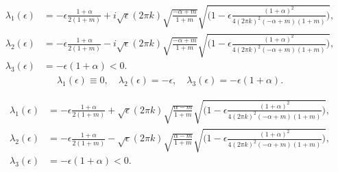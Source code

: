 \documentclass[a4paper,11pt]{article}
\theoremstyle{remark}
\begin{document}
\begin{align*}
 \lambda_1(\epsilon) &= - \epsilon\frac{1+\alpha}{2(1+m)} + i\sqrt{\epsilon}(2\pi k)\sqrt{\frac{-\alpha+m}{1+m}}\sqrt{\Big(1-\epsilon \frac{(1+\alpha)^2}{4(2\pi k)^2(-\alpha+m)(1+m)}\Big)},\\
 \lambda_2(\epsilon) &= - \epsilon\frac{1+\alpha}{2(1+m)} - i\sqrt{\epsilon}(2\pi k)\sqrt{\frac{-\alpha+m}{1+m}}\sqrt{\Big(1-\epsilon \frac{(1+\alpha)^2}{4(2\pi k)^2(-\alpha+m)(1+m)}\Big)},\\
 \lambda_3(\epsilon) &= -\epsilon(1+\alpha)<0.
\end{align*}
\begin{align*}
 \lambda_1(\epsilon)\equiv 0, \quad \lambda_2(\epsilon)= -\epsilon, \quad \lambda_3(\epsilon) = -\epsilon(1+\alpha).
\end{align*}

\begin{align*}
 \lambda_1(\epsilon) &= - \epsilon\frac{1+\alpha}{2(1+m)} + \sqrt{\epsilon}(2\pi k)\sqrt{\frac{\alpha-m}{1+m}}\sqrt{\Big(1-\epsilon \frac{(1+\alpha)^2}{4(2\pi k)^2(-\alpha+m)(1+m)}\Big)},\\
 \lambda_2(\epsilon) &= - \epsilon\frac{1+\alpha}{2(1+m)} - \sqrt{\epsilon}(2\pi k)\sqrt{\frac{\alpha-m}{1+m}}\sqrt{\Big(1-\epsilon \frac{(1+\alpha)^2}{4(2\pi k)^2(-\alpha+m)(1+m)}\Big)},\\
 \lambda_3(\epsilon) &= -\epsilon(1+\alpha)<0.
\end{align*}
\end{document}
